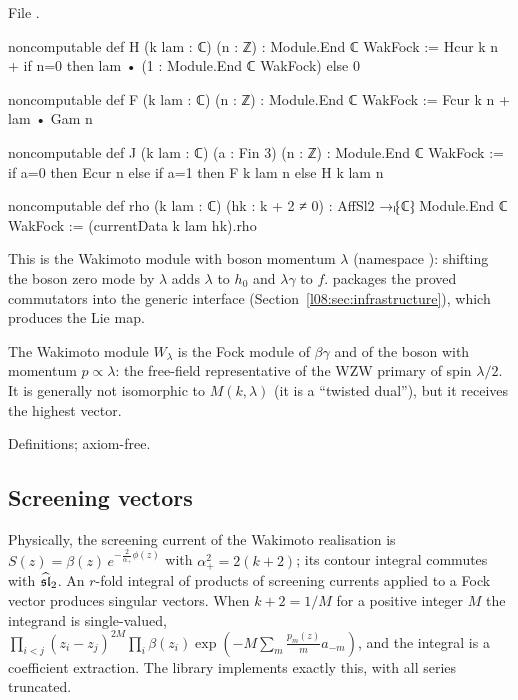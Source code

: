 \noindent File .
\begin{leancode}
noncomputable def H (k lam : ℂ) (n : ℤ) : Module.End ℂ WakFock :=
  Hcur k n + if n=0 then lam • (1 : Module.End ℂ WakFock) else 0

noncomputable def F (k lam : ℂ) (n : ℤ) : Module.End ℂ WakFock :=
  Fcur k n + lam • Gam n

noncomputable def J (k lam : ℂ) (a : Fin 3) (n : ℤ) : Module.End ℂ WakFock :=
  if a=0 then Ecur n else if a=1 then F k lam n else H k lam n

noncomputable def rho (k lam : ℂ) (hk : k + 2 ≠ 0) :
    AffSl2 →ₗ⁅ℂ⁆ Module.End ℂ WakFock := (currentData k lam hk).rho
\end{leancode}

\begin{dictionary}
This is the Wakimoto module with boson momentum $\lambda$ (namespace ): shifting the boson
zero mode by $\lambda$ adds $\lambda$ to $h_0$ and $\lambda\gamma$ to $f$.  packages the proved
commutators into the generic interface  (Section~\ref{l08:sec:infrastructure}),
which produces the Lie map.
\end{dictionary}

\begin{physics}
The Wakimoto module $W_\lambda$ is the Fock module of $\beta\gamma$ and of the boson with momentum
$p\propto\lambda$: the free-field representative of the WZW primary of spin $\lambda/2$. It is generally not
isomorphic to $M(k,\lambda)$ (it is a ``twisted dual''), but it receives the highest vector.
\end{physics}

\begin{status}
Definitions; axiom-free.
\end{status}

\subsection{Screening vectors}

Physically, the screening current of the Wakimoto realisation is
$S(z) = \beta(z)\,e^{-\frac{2}{\alpha_+}\phi(z)}$ with $\alpha_+^2 = 2(k+2)$; its contour integral commutes with
$\widehat{\mathfrak{sl}}_2$. An $r$-fold integral of products of screening currents applied to a Fock vector produces
singular vectors. When $k+2 = 1/M$ for a positive integer $M$ the integrand is single-valued,
$\prod_{i<j}(z_i-z_j)^{2M}\prod_i\beta(z_i)\exp(-M\sum_m\frac{p_m(z)}{m}a_{-m})$, and the integral is a
coefficient extraction. The library implements exactly this, with all series truncated.

